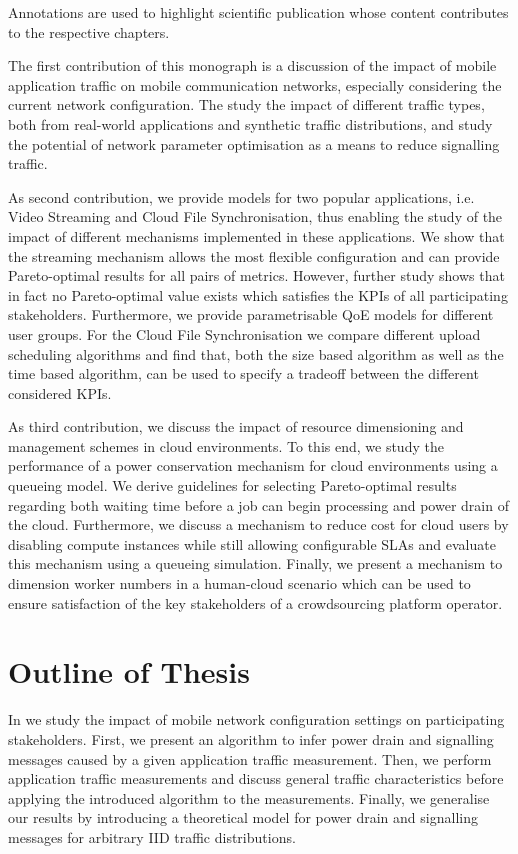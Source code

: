 Annotations are used to highlight scientific publication whose content contributes to the respective chapters.

The first contribution of this monograph is a discussion of the impact of mobile application traffic on mobile communication networks, especially considering the current network configuration.
The study the impact of different traffic types, both from real-world applications and synthetic traffic distributions, and study the potential of network parameter optimisation as a means to reduce signalling traffic.

As second contribution, we provide models for two popular applications, i.e. Video Streaming and Cloud File Synchronisation, thus enabling the study of the impact of different mechanisms implemented in these applications.
We show that the streaming mechanism allows the most flexible configuration and can provide Pareto-optimal results for all pairs of metrics.
However, further study shows that in fact no Pareto-optimal value exists which satisfies the \glspl{KPI} of all participating stakeholders.
Furthermore, we provide parametrisable \gls{QoE} models for different user groups.
For the Cloud File Synchronisation we compare different upload scheduling algorithms and find that, both the size based algorithm as well as the time based algorithm, can be used to specify a tradeoff between the different considered \glspl{KPI}.

As third contribution, we discuss the impact of resource dimensioning and management schemes in cloud environments.
To this end, we study the performance of a power conservation mechanism for cloud environments using a queueing model.
We derive guidelines for selecting Pareto-optimal results regarding both waiting time before a job can begin processing and power drain of the cloud.
Furthermore, we discuss a mechanism to reduce cost for cloud users by disabling compute instances while still allowing configurable \glspl{SLA} and evaluate this mechanism using a queueing simulation.
Finally, we present a mechanism to dimension worker numbers in a human-cloud scenario which can be used to ensure satisfaction of the key stakeholders of a crowdsourcing platform operator.

\section{Outline of Thesis}\label{sec:introduction:outline}

In  we study the impact of mobile network configuration settings on participating stakeholders.
First, we present an algorithm to infer power drain and signalling messages caused by a given application traffic measurement.
Then, we perform application traffic measurements and discuss general traffic characteristics before applying the introduced algorithm to the measurements.
Finally, we generalise our results by introducing a theoretical model for power drain and signalling messages for arbitrary \gls{IID} traffic distributions.

